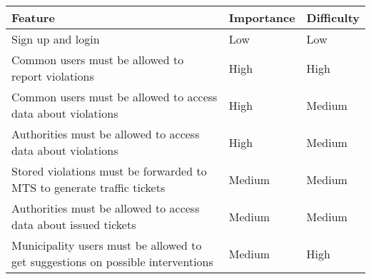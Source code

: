 \documentclass[./main.tex]{subfiles}
\begin{document}
\begin{table}[H]
\centering
\begin{tabularx}{\textwidth}{|X|l|l|}
\hline
Feature & Importance & Difficulty\tabularnewline
\hline
Sign up and login & Low & Low\tabularnewline
Common users must be allowed to report violations & High &
High\tabularnewline
Common users must be allowed to access data about violations & High &
Medium\tabularnewline
Authorities must be allowed to access data about violations & High &
Medium\tabularnewline
Stored violations must be forwarded to MTS to generate traffic tickets & Medium
& Medium\tabularnewline
Authorities must be allowed to access data about issued tickets & Medium &
Medium\tabularnewline
Municipality users must be allowed to get suggestions on possible interventions
& Medium & High\tabularnewline
\hline
\end{tabularx}
\end{table}
\end{document}
